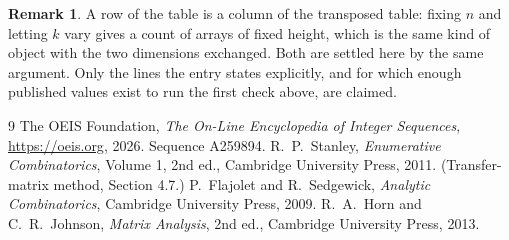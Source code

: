 \documentclass[11pt,a4paper]{article}
\theoremstyle{plain}
\theoremstyle{definition}
\newtheorem{remark}[theorem]{Remark}
\begin{document}
\begin{remark}
A row of the table is a column of the transposed table: fixing $n$ and letting $k$ vary gives a
count of arrays of fixed height, which is the same kind of object with the two dimensions
exchanged. Both are settled here by the same argument. Only the lines the entry states
explicitly, and for which enough published values exist to run the first check above, are
claimed.
\end{remark}

\begin{thebibliography}{9}
 The OEIS Foundation, \emph{The On-Line Encyclopedia of Integer
Sequences}, \url{https://oeis.org}, 2026. Sequence A259894.
 R.~P.~Stanley, \emph{Enumerative Combinatorics}, Volume 1, 2nd ed.,
Cambridge University Press, 2011. (Transfer-matrix method, Section 4.7.)
 P.~Flajolet and R.~Sedgewick, \emph{Analytic Combinatorics}, Cambridge
University Press, 2009.
 R.~A.~Horn and C.~R.~Johnson, \emph{Matrix Analysis}, 2nd ed., Cambridge
University Press, 2013.
\end{thebibliography}
\end{document}
